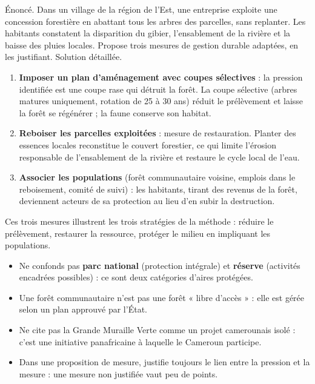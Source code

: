 \documentclass[11pt]{article}
\begin{document}
\begin{exoresolu}
Énoncé. Dans un village de la région de l'Est, une entreprise exploite une concession forestière en abattant tous les arbres des parcelles, sans replanter. Les habitants constatent la disparition du gibier, l'ensablement de la rivière et la baisse des pluies locales. Propose trois mesures de gestion durable adaptées, en les justifiant.
\tcblower
Solution détaillée.
\begin{enumerate}
\item \textbf{Imposer un plan d'aménagement avec coupes sélectives} : la pression identifiée est une coupe rase qui détruit la forêt. La coupe sélective (arbres matures uniquement, rotation de 25 à 30 ans) réduit le prélèvement et laisse la forêt se régénérer ; la faune conserve son habitat.
\item \textbf{Reboiser les parcelles exploitées} : mesure de restauration. Planter des essences locales reconstitue le couvert forestier, ce qui limite l'érosion responsable de l'ensablement de la rivière et restaure le cycle local de l'eau.
\item \textbf{Associer les populations} (forêt communautaire voisine, emplois dans le reboisement, comité de suivi) : les habitants, tirant des revenus de la forêt, deviennent acteurs de sa protection au lieu d'en subir la destruction.
\end{enumerate}
Ces trois mesures illustrent les trois stratégies de la méthode : réduire le prélèvement, restaurer la ressource, protéger le milieu en impliquant les populations.
\end{exoresolu}

\begin{attention}
\begin{itemize}
\item Ne confonds pas \textbf{parc national} (protection intégrale) et \textbf{réserve} (activités encadrées possibles) : ce sont deux catégories d'aires protégées.
\item Une forêt communautaire n'est pas une forêt « libre d'accès » : elle est gérée selon un plan approuvé par l'État.
\item Ne cite pas la Grande Muraille Verte comme un projet camerounais isolé : c'est une initiative panafricaine à laquelle le Cameroun participe.
\item Dans une proposition de mesure, justifie toujours le lien entre la pression et la mesure : une mesure non justifiée vaut peu de points.
\end{itemize}
\end{attention}
\end{document}
